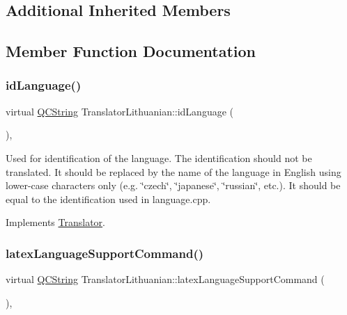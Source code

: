 \subsection*{Additional Inherited Members}


\subsection{Member Function Documentation}
\mbox{\label{class_translator_lithuanian_a941f30a280e8e59f04e4218e862bd3aa}} 
\subsubsection{\texorpdfstring{idLanguage()}{idLanguage()}}
{\footnotesize\ttfamily virtual \mbox{\hyperlink{class_q_c_string}{Q\+C\+String}} Translator\+Lithuanian\+::id\+Language (\begin{DoxyParamCaption}{ }\end{DoxyParamCaption})\hspace{0.3cm}{\ttfamily [inline]}, {\ttfamily [virtual]}}

Used for identification of the language. The identification should not be translated. It should be replaced by the name of the language in English using lower-\/case characters only (e.\+g. \char`\"{}czech\char`\"{}, \char`\"{}japanese\char`\"{}, \char`\"{}russian\char`\"{}, etc.). It should be equal to the identification used in language.\+cpp. 

Implements \mbox{\hyperlink{class_translator}{Translator}}.

\mbox{\label{class_translator_lithuanian_a37d564c65bf838c3a774bd4650f7e52a}} 
\subsubsection{\texorpdfstring{latexLanguageSupportCommand()}{latexLanguageSupportCommand()}}
{\footnotesize\ttfamily virtual \mbox{\hyperlink{class_q_c_string}{Q\+C\+String}} Translator\+Lithuanian\+::latex\+Language\+Support\+Command (\begin{DoxyParamCaption}{ }\end{DoxyParamCaption})\hspace{0.3cm}{\ttfamily [inline]}, {\ttfamily [virtual]}}

